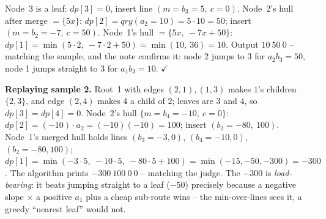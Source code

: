 \begin{tracebox}
Node~3 is a leaf: \(\mathit{dp}[3]=0\), insert line \((m=b_3{=}5,\ c{=}0)\). Node~2's hull after merge
\(=\{5x\}\): \(\mathit{dp}[2]=\mathit{qry}(a_2{=}10)=5\cdot10=50\); insert \((m=b_2{=}-7,\ c{=}50)\).
Node~1's hull \(=\{5x,\ -7x+50\}\): \(\mathit{dp}[1]=\min(5\cdot2,\ -7\cdot2+50)=\min(10,\ 36)=10\).
Output \(\boxed{10}\ \boxed{50}\ \boxed{0}\) -- matching the sample, and the note confirms it: node 2
jumps to 3 for \(a_2 b_3=50\), node 1 jumps straight to 3 for \(a_1 b_3=10\). \(\checkmark\)
\end{tracebox}

\noindent\textbf{Replaying sample 2.} Root~1 with edges \((2,1),(1,3)\) makes \(1\)'s children
\(\{2,3\}\), and edge \((2,4)\) makes \(4\) a child of \(2\); leaves are \(3\) and \(4\), so
\(\mathit{dp}[3]=\mathit{dp}[4]=0\). Node~2's hull \(\{m=b_4{=}-10,\ c=0\}\):
\(\mathit{dp}[2]=(-10)\cdot a_2=(-10)(-10)=100\); insert \((b_2{=}-80,\ 100)\). Node~1's merged hull
holds lines \((b_3{=}-3,0)\), \((b_4{=}-10,0)\), \((b_2{=}-80,100)\);
\(\mathit{dp}[1]=\min(-3\cdot5,\ -10\cdot5,\ -80\cdot5+100)=\min(-15,-50,-300)=-300\). The algorithm
prints \(\boxed{-300}\ \boxed{100}\ \boxed{0}\ \boxed{0}\) -- matching the judge. The \(-300\) is
\emph{load-bearing}: it beats jumping straight to a leaf (\(-50\)) precisely because a negative
slope \(\times\) a positive \(a_1\) plus a cheap sub-route wins -- the min-over-lines sees it, a greedy
``nearest leaf'' would not.


